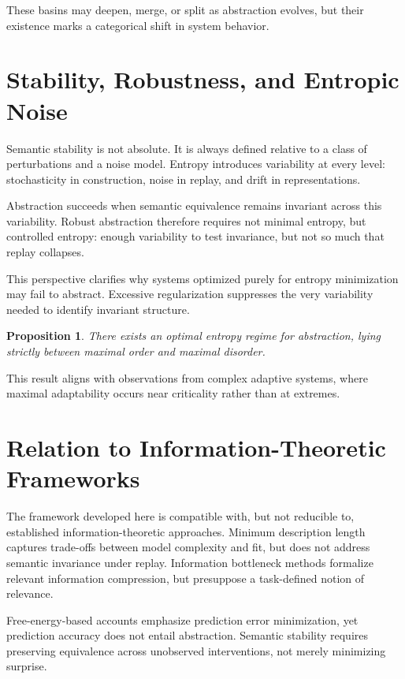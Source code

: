 \documentclass[11pt]{article}
\newtheorem{proposition}{Proposition}[section]
\begin{document}
These basins may deepen, merge, or split as abstraction evolves, but their existence marks a categorical shift in system behavior.

\section{Stability, Robustness, and Entropic Noise}

Semantic stability is not absolute. It is always defined relative to a class of perturbations and a noise model. Entropy introduces variability at every level: stochasticity in construction, noise in replay, and drift in representations.

Abstraction succeeds when semantic equivalence remains invariant across this variability. Robust abstraction therefore requires not minimal entropy, but controlled entropy: enough variability to test invariance, but not so much that replay collapses.

This perspective clarifies why systems optimized purely for entropy minimization may fail to abstract. Excessive regularization suppresses the very variability needed to identify invariant structure.

\begin{proposition}
There exists an optimal entropy regime for abstraction, lying strictly between maximal order and maximal disorder.
\end{proposition}

This result aligns with observations from complex adaptive systems, where maximal adaptability occurs near criticality rather than at extremes.

\section{Relation to Information-Theoretic Frameworks}

The framework developed here is compatible with, but not reducible to, established information-theoretic approaches. Minimum description length captures trade-offs between model complexity and fit, but does not address semantic invariance under replay. Information bottleneck methods formalize relevant information compression, but presuppose a task-defined notion of relevance.

Free-energy-based accounts emphasize prediction error minimization, yet prediction accuracy does not entail abstraction. Semantic stability requires preserving equivalence across unobserved interventions, not merely minimizing surprise.
\end{document}
